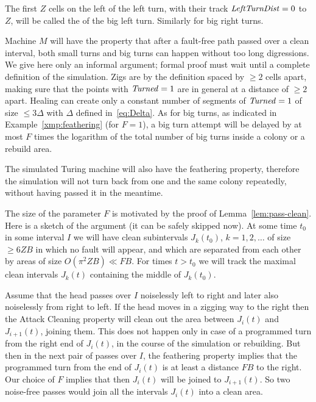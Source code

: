 \documentclass[11pt]{memoir}
\theoremstyle{definition} %
\renewcommand{\le}{\leq}
\renewcommand{\ge}{\geq}
\newcommand{\fld}[1]{\ensuremath{\textit{#1\/}}}
\def\B{B}
\newcommand{\F}{F}
\newcommand{\passno}{\pi}
\newcommand{\Z}{Z} %
\newcommand{\leftTurnDist}{\fld{LeftTurnDist}}
\newcommand{\Turned}{\fld{Turned}} %
\begin{document}
\begin{definition}\label{def:footprint}
  The first \( \Z \) cells on the left of the left turn, with their track \( \leftTurnDist=0 \) to \( \Z \),
  will be called the  of the big left turn.
  Similarly for big right turns.
\end{definition}

Machine \( M \) will have the property that after a fault-free
path passed over a clean interval, both small turns and big turns can happen without too
long digressions.
We give here only an informal argument; formal proof must wait until 
a complete definition of the simulation.
Zigs are by the definition spaced by \( \ge 2 \) cells apart, making sure that the points
with \( \Turned=1 \) are in general at a distance of \( \ge 2 \) apart.
Healing can create only a constant number of segments of \( \Turned=1 \) of size \( \le 3\Delta \)
with \( \Delta \) defined in~\eqref{eq:Delta}.
As for big turns, as indicated in Example~\ref{xmp:feathering} (for \( \F=1 \)),
a big turn attempt will be delayed by at most \( \F \) times the logarithm
of the total number of big turns inside a colony or a rebuild area.

The simulated Turing machine will also have the feathering property,
therefore the simulation will not turn back 
from one and the same colony repeatedly, without having passed it in the meantime.

\begin{sloppypar}
\begin{remark}\label{rem:big-turns}
  The size of the parameter \( \F \) is motivated by the proof of Lemma~\ref{lem:pass-clean}.
  Here is a sketch of the argument (it can be safely skipped now).
   At some time \( t_{0} \) in some interval \( I \)
  we will have clean subintervals \( J_{k}(t_{0}) \), \( k=1,2,\dots \)
  of size \( \ge 6\Z\B \) in which no fault will appear, and which are separated from each other by areas of
  size \( O(\passno^{2}\Z\B)\ll\F\B \).
  For times \( t>t_{0} \) we will track the maximal clean intervals \( J_{k}(t) \) containing
  the middle of \( J_{k}(t_{0}) \).

  Assume that the head passes over \( I \) noiselessly left to right and later
  also noiselessly from right to left.
  If the head moves in a zigging way to the
  right then the Attack Cleaning property will clean out the area between \( J_{i}(t) \) and \( J_{i+1}(t) \),
  joining them.
  This does not happen only in case of a programmed turn
  from the right end of \( J_{i}(t) \), in the course of the simulation or rebuilding.
  But then in the next pair of passes over \( I \), the feathering property implies that
  the programmed turn from the end of \( J_{i}(t) \) is at least a distance \( \F\B \) to the right.
  Our choice of \( \F \) implies that then \( J_{i}(t) \) will be joined to \( J_{i+1}(t) \).
  So two noise-free passes would join all the intervals \( J_{i}(t) \) into a clean area.  
\end{remark}  
\end{sloppypar}
\end{document}
